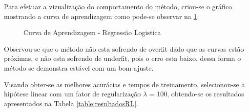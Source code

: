Para efetuar a vizualização do comportamento do método, criou-se o gráfico mostrando a curva de aprendizagem como pode-se observar na \ref{fig:RL}.

\begin{figure}[h]
	\centering
{}
\caption{Curva de Aprendizagem - Regressão Logistica}
\label{fig:RL}
\end{figure}

Observou-se que o método não esta sofrendo de overfit dado que as curvas estão próximas, e não esta sofrendo de underfit, pois o erro esta baixo, dessa forma o método se demonstra estável com um bom ajuste.

Visando obter-se as melhores acurácias e tempos de treinamento, selecionou-se a hipótese linear com um fator de regularização \(\lambda\) = 100, obtendo-se os resultados apresentados na Tabela \ref{table:resultadosRL}.

